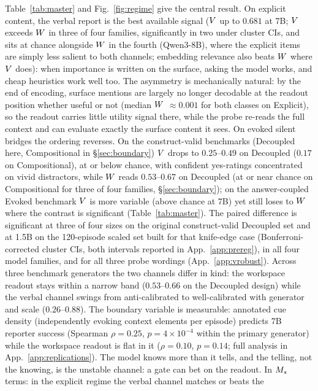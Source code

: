 Table~\ref{tab:master} and Fig.~\ref{fig:regime} give the central result. On
explicit content, the verbal report is the best available signal
($V$ up to $0.681$ at 7B; $V$ exceeds $W$ in three of four
families, significantly in two under cluster CIs, and sits at chance alongside
$W$ in the fourth (Qwen3-8B), where the explicit items are simply less
salient to both channels; embedding relevance also beats $W$ where $V$ does): when importance is written on the surface, asking the model
works, and cheap heuristics work well too. The asymmetry is mechanically
natural: by the end of encoding, surface mentions are largely no longer
decodable at the readout position whether useful or not (median $W$
${\approx}0.001$ for both classes on Explicit), so the readout carries
little utility signal there, while the probe re-reads the full context and
can evaluate exactly the surface content it sees. On evoked silent bridges the ordering reverses. On the construct-valid benchmarks (Decoupled here, Compositional in
\S\ref{sec:boundary}) $V$ drops to $0.25$--$0.49$ on Decoupled ($0.17$ on Compositional), at
or below chance, with confident yes-ratings concentrated on vivid
distractors, while $W$ reads $0.53$--$0.67$ on Decoupled (at or near
chance on Compositional for three of four families, \S\ref{sec:boundary}); on the
answer-coupled Evoked benchmark $V$ is more variable
(above chance at 7B) yet still loses to $W$ where the contrast is significant
(Table~\ref{tab:master}). The paired difference is
significant at three of four sizes on the original construct-valid Decoupled
set and at 1.5B on the 120-episode scaled set built for that knife-edge case
(Bonferroni-corrected cluster CIs, both intervals reported in
App.~\ref{app:prereg}), in all four model families, and for all three
probe wordings (App.~\ref{app:vrobust}). Across
three benchmark generators the two channels differ in kind: the workspace
readout stays within a narrow band ($0.53$--$0.66$ on the Decoupled design)
while the verbal channel swings from anti-calibrated to well-calibrated with
generator and scale ($0.26$--$0.88$). The boundary variable is measurable:
annotated cue density (independently evoking context elements per episode)
predicts 7B reporter success (Spearman $\rho{=}0.25$, $p{=}4\times10^{-4}$
within the primary generator) while the workspace readout is flat in it
($\rho{=}0.10$, $p{=}0.14$; full analysis in App.~\ref{app:replications}). The model knows more than it tells, and the
telling, not the knowing, is the unstable channel: a gate can bet on the
readout. In $M_s$ terms: in the explicit regime the verbal channel matches or beats the
